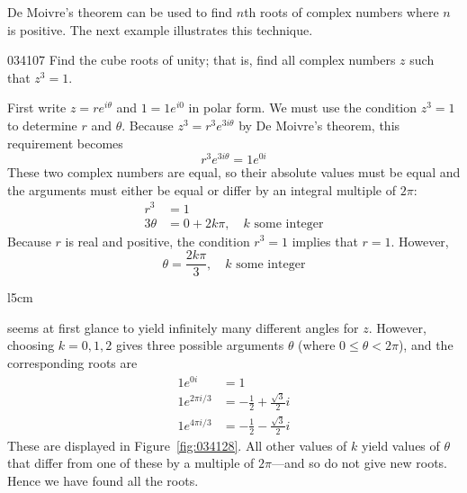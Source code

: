 De Moivre's theorem can be used to find $n$th roots of complex numbers where $n$ is positive. The next example illustrates this technique.


\begin{example}{}{034107}
Find the cube roots of unity; that is, find all complex numbers $z$ such that $z^{3} = 1$.


\begin{solution}
  First write $z = re^{i\theta}$ and $1 = 1e^{i0}$ in polar form. We must use the condition $z^{3} = 1$ to determine $r$ and $\theta$. Because $z^{3} = r^{3}e^{3i\theta}$ by De Moivre's theorem, this requirement becomes
\begin{equation*}
r^3 e^{3i\theta} = 1 e^{0i}
\end{equation*}
These two complex numbers are equal, so
 their absolute values must be equal and the arguments must either be 
equal or differ by an integral multiple of $2\pi$:
\begin{align*}
r^3 & = 1 \\
3 \theta &= 0 +2k\pi, \quad k \mbox{ some integer} 
\end{align*}
Because $r$ is real and positive, the condition $r^{3} = 1$ implies that $r = 1$. However,
\begin{equation*}
\theta = \frac{2k\pi}{3}, \quad k \mbox{ some integer}
\end{equation*}
\begin{wrapfigure}[8]{l}{5cm}
        \vspace*{-2em}
	\centering
	
	\caption{\label{fig:034128}}
\end{wrapfigure}
\setlength{\rightskip}{0pt plus 200pt}
seems at first glance to yield infinitely many different angles for $z$. However, choosing $k = 0, 1, 2$ gives three possible arguments $\theta$ (where $0 \leq \theta < 2\pi$), and the corresponding roots are
\begin{align*}
1e^{0i} & = 1 \\
1e^{2\pi i/3} & = -\frac{1}{2} + \frac{\sqrt{3}}{2} i \\
1e^{4\pi i/3} & = -\frac{1}{2} - \frac{\sqrt{3}}{2} i
\end{align*}
These are displayed in Figure~\ref{fig:034128}. All other values of $k$
 yield values of $\theta$ that differ from one of these by a multiple of $2\pi$---and
 so do not give new roots. Hence we have found all the roots.
\end{solution}
\end{example}

